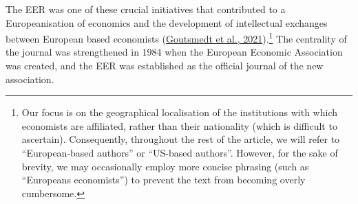 \documentclass[
  12pt,
  onecolumn]{article}
\begin{document}
\begin{table}[!h]

\caption{\label{tab:table-authors}Share of countries of authors' affiliations in EER publications (Top 10)}
\centering
{}
\end{table}

The EER was one of these crucial initiatives that contributed to a
Europeanisation of economics and the development of intellectual
exchanges between European based economists
(\protect\hyperlink{ref-goutsmedt2021}{Goutsmedt et al.,
2021}).\footnote{Our focus is on the geographical localisation of the
  institutions with which economists are affiliated, rather than their
  nationality (which is difficult to ascertain). Consequently,
  throughout the rest of the article, we will refer to ``European-based
  authors'' or ``US-based authors''. However, for the sake of brevity,
  we may occasionally employ more concise phrasing (such as ``Europeans
  economists'') to prevent the text from becoming overly cumbersome.}
The centrality of the journal was strengthened in 1984 when the European
Economic Association was created, and the EER was established as the
official journal of the new association.
\end{document}
